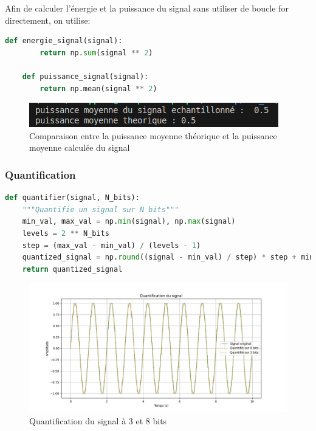 Afin de calculer l'énergie et la puissance du signal sans utiliser de boucle for directement, on utilise:

\begin{lstlisting}[language=python]
    def energie_signal(signal):
        return np.sum(signal ** 2)

    def puissance_signal(signal):
        return np.mean(signal ** 2)
\end{lstlisting}

\begin{figure}[!h]
\begin{center}
\includegraphics{screenshots/puissance_et_energie.png}
\end{center}
\caption{Comparaison entre la puissance moyenne théorique et la puissance moyenne calculée du signal}
\end{figure} 

\subsubsection{Quantification}

\begin{lstlisting}[language=python]
def quantifier(signal, N_bits):
    """Quantifie un signal sur N bits"""
    min_val, max_val = np.min(signal), np.max(signal)
    levels = 2 ** N_bits
    step = (max_val - min_val) / (levels - 1)
    quantized_signal = np.round((signal - min_val) / step) * step + min_val
    return quantized_signal
\end{lstlisting}

\begin{figure}[!h]
\begin{center}
\includegraphics[width=17cm]{screenshots/Quantification.png}
\end{center}
\caption{Quantification du signal à 3 et 8 bits}
\end{figure} 

